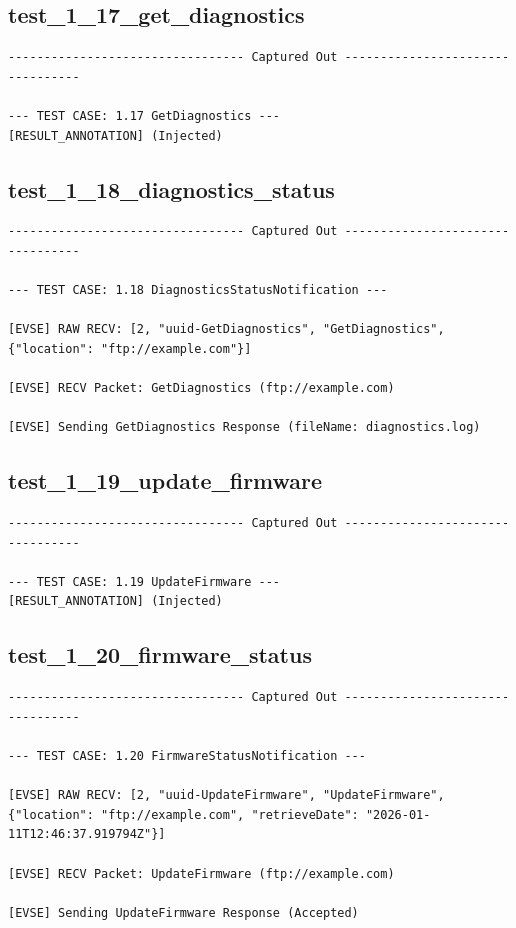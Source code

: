 \documentclass{article}
\begin{document}
\subsection*{test\_1\_17\_get\_diagnostics}
\begin{lstlisting}
--------------------------------- Captured Out ---------------------------------

--- TEST CASE: 1.17 GetDiagnostics ---
[RESULT_ANNOTATION] (Injected)
\end{lstlisting}
\subsection*{test\_1\_18\_diagnostics\_status}
\begin{lstlisting}
--------------------------------- Captured Out ---------------------------------

--- TEST CASE: 1.18 DiagnosticsStatusNotification ---

[EVSE] RAW RECV: [2, "uuid-GetDiagnostics", "GetDiagnostics", {"location": "ftp://example.com"}]

[EVSE] RECV Packet: GetDiagnostics (ftp://example.com)

[EVSE] Sending GetDiagnostics Response (fileName: diagnostics.log)
\end{lstlisting}
\subsection*{test\_1\_19\_update\_firmware}
\begin{lstlisting}
--------------------------------- Captured Out ---------------------------------

--- TEST CASE: 1.19 UpdateFirmware ---
[RESULT_ANNOTATION] (Injected)
\end{lstlisting}
\subsection*{test\_1\_20\_firmware\_status}
\begin{lstlisting}
--------------------------------- Captured Out ---------------------------------

--- TEST CASE: 1.20 FirmwareStatusNotification ---

[EVSE] RAW RECV: [2, "uuid-UpdateFirmware", "UpdateFirmware", {"location": "ftp://example.com", "retrieveDate": "2026-01-11T12:46:37.919794Z"}]

[EVSE] RECV Packet: UpdateFirmware (ftp://example.com)

[EVSE] Sending UpdateFirmware Response (Accepted)
\end{lstlisting}
\end{document}
